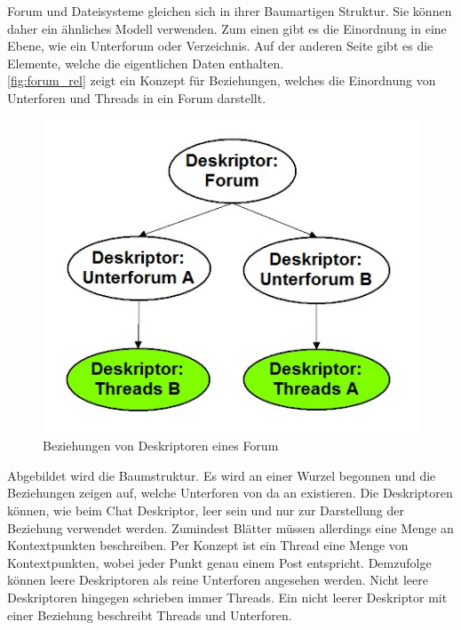 \documentclass[a4paper]{article}
\begin{document}
	Forum und Dateisysteme gleichen sich in ihrer Baumartigen Struktur. Sie können
	daher ein ähnliches Modell verwenden. Zum einen gibt es die Einordnung
	in eine Ebene, wie ein Unterforum oder Verzeichnis. Auf der anderen
	Seite gibt es die Elemente, welche die eigentlichen Daten enthalten. \\
	
	\autoref{fig:forum_rel} zeigt ein Konzept für Beziehungen, welches die
	Einordnung von Unterforen und Threads in ein Forum darstellt.
	
	\begin{figure}[H]
		\includegraphics[width=\linewidth]{../Bilder/forum_rel.jpg}
		\caption{Beziehungen von Deskriptoren eines Forum}
		\label{fig:forum_rel}
	\end{figure}
	
	Abgebildet wird die Baumstruktur. Es wird an einer Wurzel begonnen und
	die Beziehungen zeigen auf, welche Unterforen von da an existieren. Die
	Deskriptoren können, wie beim Chat Deskriptor, leer sein und nur zur
	Darstellung der Beziehung verwendet werden. Zumindest Blätter müssen
	allerdings eine Menge an Kontextpunkten beschreiben. Per Konzept ist ein Thread 
	eine Menge von Kontextpunkten, wobei jeder Punkt genau einem Post entspricht.
	Demzufolge können leere Deskriptoren als reine Unterforen angesehen werden.
	Nicht leere Deskriptoren hingegen schrieben immer Threads. Ein nicht
	leerer Deskriptor mit einer Beziehung beschreibt Threads und Unterforen. \\
	
\end{document}

